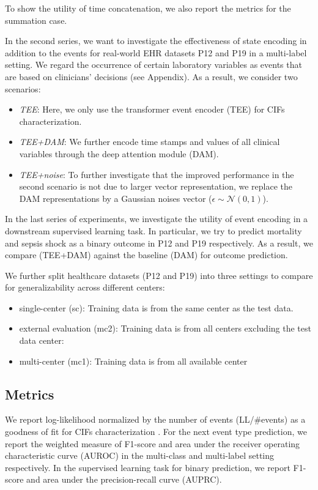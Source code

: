 \documentclass[journal,twoside,web]{ieeecolor}
\begin{document}
To show the utility of time concatenation, we also report the metrics for the summation case.

In the second series, we want to investigate the effectiveness of state encoding in addition to the events for real-world EHR datasets P12 and P19 in a multi-label setting. We regard the occurrence of certain laboratory variables as events that are based on clinicians' decisions (see Appendix). As a result, we consider two scenarios:

\begin{itemize}
    \item \emph{TEE}: Here, we only use the transformer event encoder (TEE) for CIFs characterization.
    \item \emph{TEE+DAM}: We further encode time stamps and values of all clinical variables through the deep attention module (DAM).
    \item \emph{TEE+noise}: To further investigate that the improved performance in the second scenario is not due to larger vector representation, we replace the DAM representations by a Gaussian noises vector ($\epsilon \sim \mathcal{N} (0,1)$).
\end{itemize}

In the last series of experiments, we investigate the utility of event encoding in a downstream supervised learning task. In particular, we try to predict mortality and sepsis shock as a binary outcome in P12 and P19 respectively. As a result, we compare (TEE+DAM) against the baseline (DAM) for outcome prediction.

We further split healthcare datasets (P12 and P19) into three settings to compare for generalizability across different centers:

\begin{itemize}
    \item single-center (sc): Training data is from the same center as the test data.  
    \item external evaluation (mc2): Training data is from all centers excluding the test data center:
    \item multi-center (mc1): Training data is from all available center
\end{itemize} 




\subsection*{Metrics}
We report log-likelihood normalized by the number of events (LL/\#events) as a goodness of fit for CIFs characterization \cite*{zhangSelfAttentiveHawkesProcess2020,zuoTransformerHawkesProcess2020a}. For the next event type prediction, we report the weighted measure of F1-score and area under the receiver operating characteristic curve (AUROC) in the multi-class and multi-label setting respectively. In the supervised learning task for binary prediction, we report F1-score and area under the precision-recall curve (AUPRC).
\end{document}
